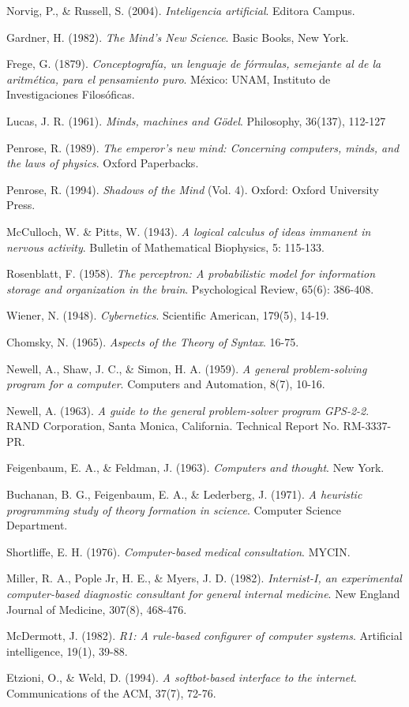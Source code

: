 \begin{thebibliography}{x}
 Norvig, P., \& Russell, S. (2004). \textit{Inteligencia artificial}. Editora Campus.

 Gardner, H. (1982). \textit{The Mind's New Science}. Basic Books, New York.

 Frege, G. (1879). \textit{Conceptografía, un lenguaje de fórmulas, semejante al de la aritmética, para el pensamiento puro}. México: UNAM, Instituto de Investigaciones Filosóficas.

 Lucas, J. R. (1961). \textit{Minds, machines and Gödel}. Philosophy, 36(137), 112-127

 Penrose, R. (1989). \textit{The emperor's new mind: Concerning computers, minds, and the laws of physics}. Oxford Paperbacks.

 Penrose, R. (1994). \textit{Shadows of the Mind} (Vol. 4). Oxford: Oxford University Press.

 McCulloch, W. \& Pitts, W. (1943). \textit{A logical calculus of ideas immanent in nervous activity}. Bulletin of Mathematical Biophysics, 5: 115-133.

 Rosenblatt, F. (1958). \textit{The perceptron: A probabilistic model for information storage and organization in the brain}. Psychological Review, 65(6): 386-408.

 Wiener, N. (1948). \textit{Cybernetics}. Scientific American, 179(5), 14-19.

 Chomsky, N. (1965). \textit{Aspects of the Theory of Syntax}. 16-75.

 Newell, A., Shaw, J. C., \& Simon, H. A. (1959). \textit{A general problem-solving program for a computer}. Computers and Automation, 8(7), 10-16.

 Newell, A. (1963). \textit{A guide to the general problem-solver program GPS-2-2}. RAND Corporation, Santa Monica, California. Technical Report No. RM-3337-PR.

 Feigenbaum, E. A., \& Feldman, J. (1963). \textit{Computers and thought}. New York.

 Buchanan, B. G., Feigenbaum, E. A., \& Lederberg, J. (1971). \textit{A heuristic programming study of theory formation in science}. Computer Science Department.

 Shortliffe, E. H. (1976). \textit{Computer-based medical consultation}. MYCIN.

 Miller, R. A., Pople Jr, H. E., \& Myers, J. D. (1982). \textit{Internist-I, an experimental computer-based diagnostic consultant for general internal medicine}. New England Journal of Medicine, 307(8), 468-476.

 McDermott, J. (1982). \textit{R1: A rule-based configurer of computer systems}. Artificial intelligence, 19(1), 39-88.

 Etzioni, O., \& Weld, D. (1994).\textit{ A softbot-based interface to the internet}. Communications of the ACM, 37(7), 72-76.


\end{thebibliography}